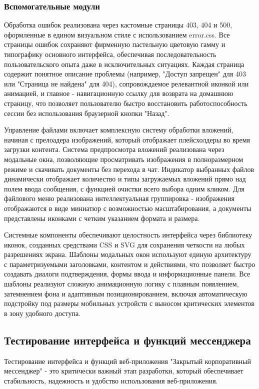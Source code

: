 \subsubsection{Вспомогательные модули}
Обработка ошибок реализована через кастомные страницы 403, 404 и 500, оформленные в едином визуальном стиле с использованием error.css. Все страницы ошибок сохраняют фирменную пастельную цветовую гамму и типографику основного интерфейса, обеспечивая последовательность пользовательского опыта даже в исключительных ситуациях. Каждая страница содержит понятное описание проблемы (например, "Доступ запрещен" для 403 или "Страница не найдена" для 404), сопровождаемое релевантной иконкой или анимацией, и главное - навигационную ссылку для возврата на домашнюю страницу, что позволяет пользователю быстро восстановить работоспособность сессии без использования браузерной кнопки "Назад".

Управление файлами включает комплексную систему обработки вложений, начиная с прелоадера изображений, который отображает плейсхолдеры во время загрузки контента. Система предпросмотра вложений реализована через модальные окна, позволяющие просматривать изображения в полноразмерном режиме и скачивать документы без перехода в чат. Индикатор выбранных файлов динамически отображает количество и типы загружаемых вложений прямо над полем ввода сообщения, с функцией очистки всего выбора одним кликом. Для файлового меню реализована интеллектуальная группировка - изображения отображаются в виде миниатюр с возможностью масштабирования, а документы представлены иконками с четким указанием формата и размера.

Системные компоненты обеспечивают целостность интерфейса через библиотеку иконок, созданных средствами CSS и SVG для сохранения четкости на любых разрешениях экрана. Шаблоны модальных окон используют единую архитектуру с параметризуемыми заголовками, контентом и действиями, что позволяет быстро создавать диалоги подтверждения, формы ввода и информационные панели. Все шаблоны реализуют сложную анимационную логику с плавным появлением, затемнением фона и адаптивным позиционированием, включая автоматическую подстройку под размеры мобильных устройств с выносом критических элементов в зону удобного доступа.

\subsection{Тестирование интерфейса и функций мессенджера}
Тестирование интерфейса и функций веб-приложения "Закрытый корпоративный мессенджер" - это критически важный этап разработки, который обеспечивает стабильность, надежность и удобство использования веб-приложения. 
